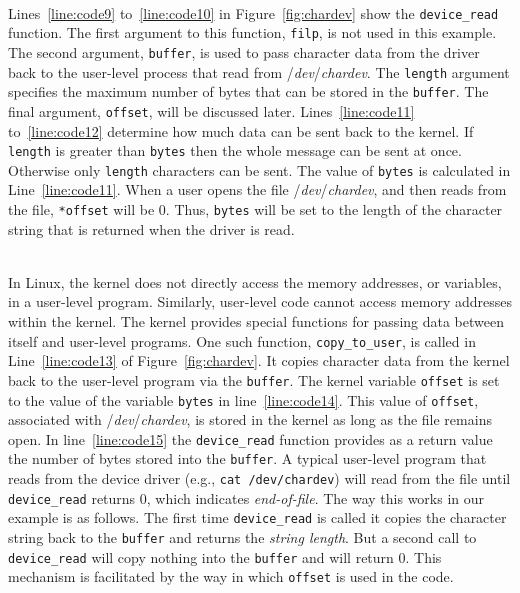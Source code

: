 \documentclass[epsfig,10pt,fullpage]{article}
\begin{document}
~\\
\noindent
Lines~\ref{line:code9} to~\ref{line:code10} in Figure~\ref{fig:chardev}
show the \texttt{device\_read} function. The
first argument to this function, \texttt{filp}, is not used in this example. The second argument,
\texttt{buffer}, is used to pass character data from the driver back to the 
user-level process that read from /{\it dev}/{\it chardev}.
The \texttt{length} argument specifies the maximum number of bytes that can be stored 
in the \texttt{buffer}. The final argument, \texttt{offset}, will be discussed later. 
Lines~\ref{line:code11} to~\ref{line:code12} determine how much data can be sent back to
the kernel. If \texttt{length} is greater than \texttt{bytes} then the whole message can
be sent at once. Otherwise only \texttt{length} characters can be sent. The value of
\texttt{bytes} is calculated in Line~\ref{line:code11}. When a user opens the file
/{\it dev}/{\it chardev}, and then reads from the file, \texttt{*offset} will be 0. Thus,
\texttt{bytes} will be set to the length of the character string that is returned when the
driver is read.

~\\
\noindent
In Linux, the kernel does not directly access the memory addresses, or variables, in
a user-level program. Similarly, user-level code cannot access memory addresses within
the kernel. The kernel provides special functions for passing data between 
itself and user-level programs. One such function, \texttt{copy\_to\_user},
is called in Line~\ref{line:code13} of Figure~\ref{fig:chardev}. It copies character data
from the kernel back to the user-level program via the \texttt{buffer}. The kernel variable
\texttt{offset} is set to the value of the variable \texttt{bytes} in 
line~\ref{line:code14}. This value of \texttt{offset},
associated with /{\it dev}/{\it chardev}, is stored in the kernel as long as the file
remains open. In line~\ref{line:code15} the \texttt{device\_read} function provides 
as a return value the number of bytes stored into the \texttt{buffer}. A typical
user-level program that reads from the device driver (e.g., \texttt{cat /dev/chardev})
will read from the file until \texttt{device\_read} returns 0, which indicates {\it
end-of-file}. The way this works in our example is as follows. The first time
\texttt{device\_read} is called it copies the character string back to the
\texttt{buffer} and returns the {\it string length}. But a second call to 
\texttt{device\_read} will copy nothing into the \texttt{buffer} and will return 0. This
mechanism is facilitated by the way in which \texttt{offset} is used in the code.
\end{document}
